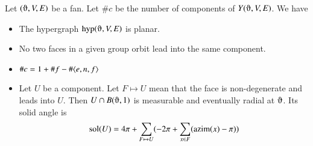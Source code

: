 \begin{lemma}  Let $(\orgn,V,E)$ be a fan.    
Let $\#c$ be the number
of components of $Y(\orgn,V,E)$.  We have
    \begin{itemize}
    \item The hypergraph $\op{hyp}(\orgn,V,E)$ is planar.
    \item No two faces in a given group orbit lead
    into the same component.
    \item $\#c = 1 + \#f - \#\langle e,n,f\rangle$
    \item Let $U$ be a component. Let $F\mapsto U$ mean
    that the face is non-degenerate and leads into $U$.  
     Then $U \cap B(\orgn,1)$ 
       is measurable and eventually radial at $\orgn$.  Its solid angle is
        $${\operatorname{sol}}(U) = 4\pi + \sum_{F\mapsto U}(-2\pi + \sum_{x\in F}
        ({\operatorname{azim}}(x)-\pi))$$
    \end{itemize}
\end{lemma}

